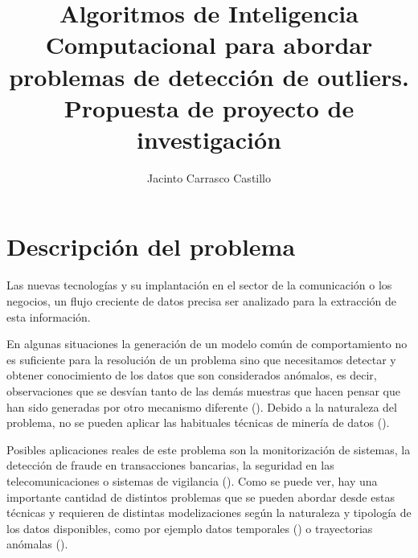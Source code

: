 \documentclass[11pt]{article}
\author{Jacinto Carrasco Castillo}
\date{}
\title{Algoritmos de Inteligencia Computacional para abordar problemas de detección de outliers.\\\medskip
\large Propuesta de proyecto de investigación}
\begin{document}
\maketitle

\section{Descripción del problema}
\label{sec:orgac60c27}


Las nuevas tecnologías y su implantación en
el sector de la comunicación o los negocios, un flujo creciente de
datos precisa ser analizado para la extracción de esta información.

En algunas situaciones la generación de un modelo común de
comportamiento no es suficiente para la resolución de un problema sino
que necesitamos detectar y obtener conocimiento de los datos que son
considerados anómalos, es decir, observaciones que se desvían tanto de
las demás muestras que hacen pensar que han sido generadas por
otro mecanismo diferente (\cite{Hawkins80identification}).  Debido a la
naturaleza del problema, no se pueden aplicar las habituales técnicas
de minería de datos (\cite{Souiden16survey}).

Posibles aplicaciones reales de este problema son la monitorización de
sistemas, la detección de fraude en transacciones bancarias, la
seguridad en las telecomunicaciones o sistemas de vigilancia
(\cite{Forestiero16self}).  Como se puede ver, hay una importante
cantidad de distintos problemas que se pueden abordar desde estas
técnicas y requieren de distintas modelizaciones según la naturaleza y
tipología de los datos disponibles, como por ejemplo datos temporales
(\cite{Gupta14outlier}) o trayectorias anómalas (\cite{Lee2008trajectory}).
\end{document}
